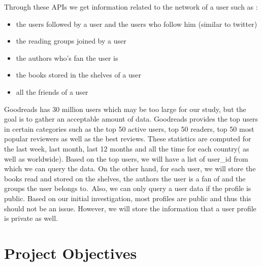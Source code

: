 \documentclass[11pt]{article}
\begin{document}
Through these APIs we get information related to the network of a user such as :
\begin{itemize}
\item the users followed by a user and the users who follow him (similar to twitter)
\item the reading groups joined by a user
\item the authors who's fan the user is
\item the books stored in the shelves of a user
\item all the friends of a user
\end{itemize}

Goodreads has 30 million users which may be too large for our study, but the goal is to gather an acceptable amount of data. Goodreads provides the top users in certain categories such as the top 50 active users, top 50 readers, top 50 most popular reviewers as well as the best reviews. These statistics are computed for the last week, last month, last 12 months and all the time for each country( as well as worldwide).
Based on the top users, we will have a list of user\_id from which we can query the data. On the other hand, for each user, we will store the books read and stored on the shelves, the authors the user is a fan of and the groups the user belongs to.\
Also, we  can only query a user data if the profile is public. Based on our initial investigation, most profiles are public and thus this  should not be an issue. However, we will store the information that a user profile is private as well.

\section{Project Objectives}
\end{document}
